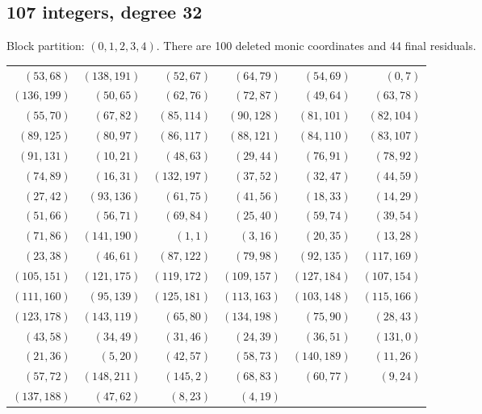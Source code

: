 \documentclass[10pt,letterpaper]{article}
\theoremstyle{remark}\newtheorem{remark}[theorem]{Remark}
\begin{document}
\subsection{107 integers, degree 32}
Block partition: $(0,1,2,3,4)$.
There are 100 deleted monic coordinates and 44 final residuals.
\begin{center}\small\begin{tabular}{rrrrrr}\toprule
$(53,68)$ & $(138,191)$ & $(52,67)$ & $(64,79)$ & $(54,69)$ & $(0,7)$\\
$(136,199)$ & $(50,65)$ & $(62,76)$ & $(72,87)$ & $(49,64)$ & $(63,78)$\\
$(55,70)$ & $(67,82)$ & $(85,114)$ & $(90,128)$ & $(81,101)$ & $(82,104)$\\
$(89,125)$ & $(80,97)$ & $(86,117)$ & $(88,121)$ & $(84,110)$ & $(83,107)$\\
$(91,131)$ & $(10,21)$ & $(48,63)$ & $(29,44)$ & $(76,91)$ & $(78,92)$\\
$(74,89)$ & $(16,31)$ & $(132,197)$ & $(37,52)$ & $(32,47)$ & $(44,59)$\\
$(27,42)$ & $(93,136)$ & $(61,75)$ & $(41,56)$ & $(18,33)$ & $(14,29)$\\
$(51,66)$ & $(56,71)$ & $(69,84)$ & $(25,40)$ & $(59,74)$ & $(39,54)$\\
$(71,86)$ & $(141,190)$ & $(1,1)$ & $(3,16)$ & $(20,35)$ & $(13,28)$\\
$(23,38)$ & $(46,61)$ & $(87,122)$ & $(79,98)$ & $(92,135)$ & $(117,169)$\\
$(105,151)$ & $(121,175)$ & $(119,172)$ & $(109,157)$ & $(127,184)$ & $(107,154)$\\
$(111,160)$ & $(95,139)$ & $(125,181)$ & $(113,163)$ & $(103,148)$ & $(115,166)$\\
$(123,178)$ & $(143,119)$ & $(65,80)$ & $(134,198)$ & $(75,90)$ & $(28,43)$\\
$(43,58)$ & $(34,49)$ & $(31,46)$ & $(24,39)$ & $(36,51)$ & $(131,0)$\\
$(21,36)$ & $(5,20)$ & $(42,57)$ & $(58,73)$ & $(140,189)$ & $(11,26)$\\
$(57,72)$ & $(148,211)$ & $(145,2)$ & $(68,83)$ & $(60,77)$ & $(9,24)$\\
$(137,188)$ & $(47,62)$ & $(8,23)$ & $(4,19)$ &  & \\
\bottomrule\end{tabular}\end{center}
\clearpage
\end{document}
